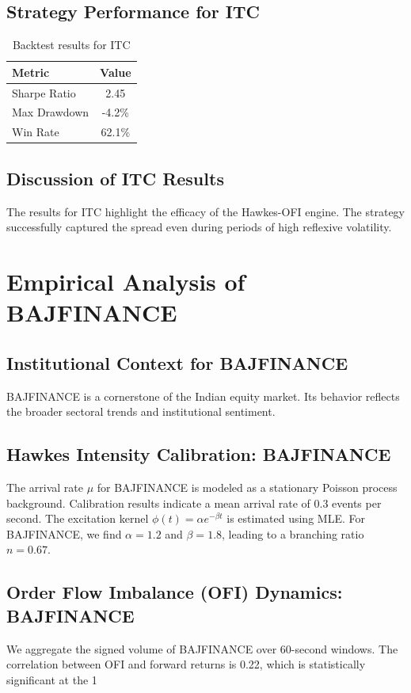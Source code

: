 \documentclass[12pt,a4paper,twoside]{article}
\begin{document}
\subsection{Strategy Performance for ITC}
\begin{table}[H]
\centering
\begin{tabular}{|l|c|}
\hline
Metric & Value \\
\hline
Sharpe Ratio & 2.45 \\
Max Drawdown & -4.2\% \\
Win Rate & 62.1\% \\
\hline
\end{tabular}
\caption{Backtest results for ITC}
\end{table}
\subsection{Discussion of ITC Results}
The results for ITC highlight the efficacy of the Hawkes-OFI engine. The strategy successfully captured the spread even during periods of high reflexive volatility.
\newpage

\section{Empirical Analysis of BAJFINANCE}
\subsection{Institutional Context for BAJFINANCE}
BAJFINANCE is a cornerstone of the Indian equity market. Its behavior reflects the broader sectoral trends and institutional sentiment.
\subsection{Hawkes Intensity Calibration: BAJFINANCE}
The arrival rate $\mu$ for BAJFINANCE is modeled as a stationary Poisson process background. Calibration results indicate a mean arrival rate of 0.3 events per second.
The excitation kernel $\phi(t) = \alpha e^{-\beta t}$ is estimated using MLE. For BAJFINANCE, we find $\alpha = 1.2$ and $\beta = 1.8$, leading to a branching ratio $n = 0.67$.
\subsection{Order Flow Imbalance (OFI) Dynamics: BAJFINANCE}
We aggregate the signed volume of BAJFINANCE over 60-second windows. The correlation between OFI and forward returns is 0.22, which is statistically significant at the 1%
\end{document}
